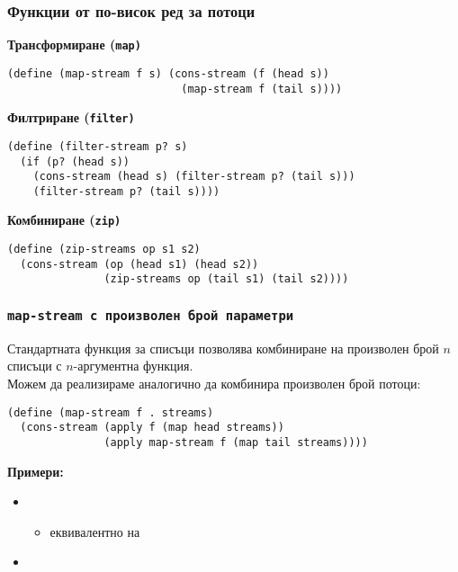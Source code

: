 \documentclass[alsotrans]{beamerswitch}
\begin{document}
\begin{frame}[fragile]
  \frametitle{Функции от по-висок ред за потоци}

  \textbf{Трансформиране (\tt{map})}
\begin{lstlisting}
(define (map-stream f s) (cons-stream (f (head s))
                           (map-stream f (tail s))))
\end{lstlisting}
  \pause
  \textbf{Филтриране (\tt{filter})}
\begin{lstlisting}
(define (filter-stream p? s)
  (if (p? (head s))
    (cons-stream (head s) (filter-stream p? (tail s)))
    (filter-stream p? (tail s))))
\end{lstlisting}
  \pause
  \textbf{Комбиниране (\tt{zip})}
\begin{lstlisting}
(define (zip-streams op s1 s2)
  (cons-stream (op (head s1) (head s2))
               (zip-streams op (tail s1) (tail s2))))
\end{lstlisting}
\end{frame}

\begin{frame}[fragile]
  \frametitle{\tt{map-stream} с произволен брой параметри}

  Стандартната функция  за списъци позволява комбиниране на произволен брой $n$ списъци с $n$-аргументна функция.\\
  \pause
  Можем да реализираме  аналогично да комбинира произволен брой потоци:\\
  \pause
\begin{lstlisting}
(define (map-stream f . streams)
  (cons-stream (apply f (map head streams))
               (apply map-stream f (map tail streams))))
\end{lstlisting}
  \pause
  \textbf{Примери:}
  \begin{itemize}[<+->]
  \item {}
    \begin{itemize}
    \item еквивалентно на 
    \end{itemize}
  \item {}
  \end{itemize}
\end{frame}
\end{document}
